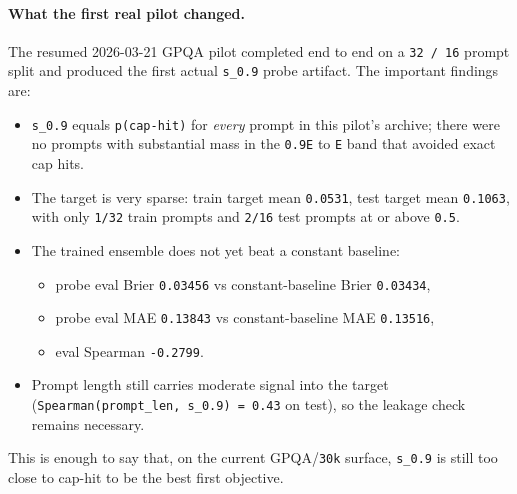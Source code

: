\documentclass[11pt]{article}
\begin{document}
\paragraph{What the first real pilot changed.}
The resumed 2026-03-21 GPQA pilot completed end to end on a \texttt{32 / 16}
prompt split and produced the first actual \texttt{s\_0.9} probe artifact.
The important findings are:
\begin{itemize}[leftmargin=1.5em]
\item \texttt{s\_0.9} equals \texttt{p(cap-hit)} for \emph{every} prompt in this
pilot's archive; there were no prompts with substantial mass in the
\texttt{0.9E} to \texttt{E} band that avoided exact cap hits.
\item The target is very sparse: train target mean \texttt{0.0531}, test target
mean \texttt{0.1063}, with only \texttt{1/32} train prompts and \texttt{2/16}
test prompts at or above \texttt{0.5}.
\item The trained ensemble does not yet beat a constant baseline:
\begin{itemize}[leftmargin=1.5em]
\item probe eval Brier \texttt{0.03456} vs constant-baseline Brier
\texttt{0.03434},
\item probe eval MAE \texttt{0.13843} vs constant-baseline MAE
\texttt{0.13516},
\item eval Spearman \texttt{-0.2799}.
\end{itemize}
\item Prompt length still carries moderate signal into the target
(\texttt{Spearman(prompt\_len, s\_0.9) = 0.43} on test), so the leakage check
remains necessary.
\end{itemize}
This is enough to say that, on the current GPQA/\texttt{30k} surface,
\texttt{s\_0.9} is still too close to cap-hit to be the best first objective.
\end{document}
